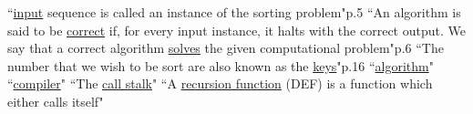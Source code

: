 \documentclass[12pt]{article}
\begin{document}
	``\underline{input} sequence is called an instance of the sorting problem"p.5\newline
	``An algorithm is said to be \underline{correct} if, for every input instance, it halts with the correct output. We say that a correct algorithm \underline{solves} the given computational problem"p.6\newline
	``The number that we wish to be sort are also known as the \underline{keys}"p.16\newline
	``\underline{algorithm}"\newline
	``\underline{compiler}"\newline
	``The \underline{call stalk}"\newline
	``A \underline{recursion function} (DEF) is a function which either calls itself"\newline
\end{document}
